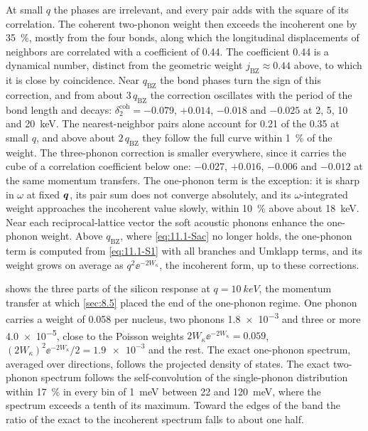 At small $q$ the phases are irrelevant, and every pair adds with the square of its correlation. The coherent two-phonon weight then exceeds the incoherent one by \SI{35}{\percent}, mostly from the four bonds, along which the longitudinal displacements of neighbors are correlated with a coefficient of 0.44. The coefficient 0.44 is a dynamical number, distinct from the geometric weight $j_{\mathrm{BZ}} \approx 0.44$ above, to which it is close by coincidence. Near $q_{\mathrm{BZ}}$ the bond phases turn the sign of this correction, and from about $3\,q_{\mathrm{BZ}}$ the correction oscillates with the period of the bond length and decays: $\delta^{\mathrm{coh}}_2 = -0.079$, $+0.014$, $-0.018$ and $-0.025$ at 2, 5, 10 and \SI{20}{keV}. The nearest-neighbor pairs alone account for 0.21 of the 0.35 at small $q$, and above about $2\,q_{\mathrm{BZ}}$ they follow the full curve within \SI{1}{\percent} of the weight. The three-phonon correction is smaller everywhere, since it carries the cube of a correlation coefficient below one: $-0.027$, $+0.016$, $-0.006$ and $-0.012$ at the same momentum transfers. The one-phonon term is the exception: it is sharp in $\omega$ at fixed $\bm{q}$, its pair sum does not converge absolutely, and its $\omega$-integrated weight approaches the incoherent value slowly, within \SI{10}{\percent} above about \SI{18}{keV}. Near each reciprocal-lattice vector the soft acoustic phonons enhance the one-phonon weight. Above $q_{\mathrm{BZ}}$, where \cref{eq:11.1-Sac} no longer holds, the one-phonon term is computed from \cref{eq:11.1-S1} with all branches and Umklapp terms, and its weight grows on average as $q^2\ee^{-2W_\kappa}$, the incoherent form, up to these corrections.

 shows the three parts of the silicon response at $q = \SI{10}{keV}$, the momentum transfer at which \cref{sec:8.5} placed the end of the one-phonon regime. One phonon carries a weight of 0.058 per nucleus, two phonons \num{1.8e-3} and three or more \num{4.0e-5}, close to the Poisson weights $2W_\kappa\ee^{-2W_\kappa} = 0.059$, $(2W_\kappa)^2\ee^{-2W_\kappa}/2 = \num{1.9e-3}$ and the rest. The exact one-phonon spectrum, averaged over directions, follows the projected density of states. The exact two-phonon spectrum follows the self-convolution of the single-phonon distribution within \SI{17}{\percent} in every bin of \SI{1}{meV} between 22 and \SI{120}{meV}, where the spectrum exceeds a tenth of its maximum. Toward the edges of the band the ratio of the exact to the incoherent spectrum falls to about one half.

